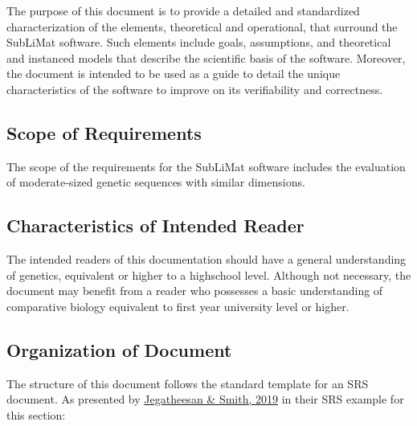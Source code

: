 \documentclass[12pt]{article}
\begin{document}
The purpose of this document is to provide a detailed and standardized characterization of 
the elements, theoretical and operational, that surround the SubLiMat software. Such 
elements include goals, assumptions, and theoretical and instanced models that describe 
the scientific basis of the software. Moreover, the document is intended to be used as a guide to detail 
the unique characteristics of the software to improve on its verifiability and correctness. 


\subsection{Scope of Requirements} 

The scope of the requirements for the SubLiMat software includes the evaluation of 
moderate-sized genetic sequences with similar dimensions. 




\subsection{Characteristics of Intended Reader} \label{sec_IntendedReader}

The intended readers of this documentation should have a general understanding of genetics, 
equivalent or higher to a highschool level. Although not necessary, the document may benefit
from a reader who possesses a basic understanding of comparative biology equivalent to first 
year university level or higher.  



\subsection{Organization of Document}

The structure of this document follows the standard template for an SRS document.
As presented by \href{https://jacquescarette.github.io/Drasil/examples/swhsnopcm/SRS/HTML/SWHSNoPCM_SRS.html}
{Jegatheesan \& Smith, 2019} in their SRS example for this section:
\end{document}
